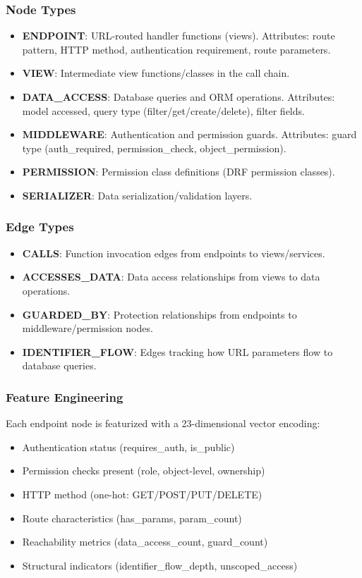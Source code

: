 \documentclass[conference]{IEEEtran}
\begin{document}
\subsubsection{Node Types}

\begin{itemize}
    \item \textbf{ENDPOINT}: URL-routed handler functions (views). Attributes: route pattern, HTTP method, authentication requirement, route parameters.
    \item \textbf{VIEW}: Intermediate view functions/classes in the call chain.
    \item \textbf{DATA\_ACCESS}: Database queries and ORM operations. Attributes: model accessed, query type (filter/get/create/delete), filter fields.
    \item \textbf{MIDDLEWARE}: Authentication and permission guards. Attributes: guard type (auth\_required, permission\_check, object\_permission).
    \item \textbf{PERMISSION}: Permission class definitions (DRF permission classes).
    \item \textbf{SERIALIZER}: Data serialization/validation layers.
\end{itemize}

\subsubsection{Edge Types}

\begin{itemize}
    \item \textbf{CALLS}: Function invocation edges from endpoints to views/services.
    \item \textbf{ACCESSES\_DATA}: Data access relationships from views to data operations.
    \item \textbf{GUARDED\_BY}: Protection relationships from endpoints to middleware/permission nodes.
    \item \textbf{IDENTIFIER\_FLOW}: Edges tracking how URL parameters flow to database queries.
\end{itemize}

\subsubsection{Feature Engineering}

Each endpoint node is featurized with a 23-dimensional vector encoding:
\begin{itemize}
    \item Authentication status (requires\_auth, is\_public)
    \item Permission checks present (role, object-level, ownership)
    \item HTTP method (one-hot: GET/POST/PUT/DELETE)
    \item Route characteristics (has\_params, param\_count)
    \item Reachability metrics (data\_access\_count, guard\_count)
    \item Structural indicators (identifier\_flow\_depth, unscoped\_access)
\end{itemize}
\end{document}
